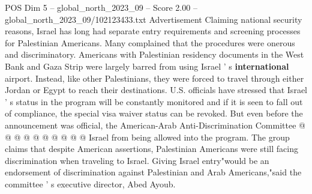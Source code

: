 \begin{textsample}{POS Dim 5 – global\_north\_2023\_09 – Score 2.00 – global\_north\_2023\_09/102123433.txt}
Advertisement Claiming national security reasons, Israel has long had separate entry requirements and screening processes for Palestinian Americans.
Many complained that the procedures were onerous and discriminatory.
Americans with Palestinian residency documents in the West Bank and Gaza Strip were largely barred from using Israel ' s \textbf{international} airport.
Instead, like other Palestinians, they were forced to travel through either Jordan or Egypt to reach their destinations.
U.S. officials have stressed that Israel ' s status in the program will be constantly monitored and if it is seen to fall out of compliance, the special visa waiver status can be revoked.
But even before the announcement was official, the American-Arab Anti-Discrimination Committee @ @ @ @ @ @ @ @ @ @ Israel from being allowed into the program.
The group claims that despite American assertions, Palestinian Americans were still facing discrimination when traveling to Israel.
Giving Israel entry"would be an endorsement of discrimination against Palestinian and Arab Americans,"said the committee ' s executive director, Abed Ayoub.

\end{textsample}
